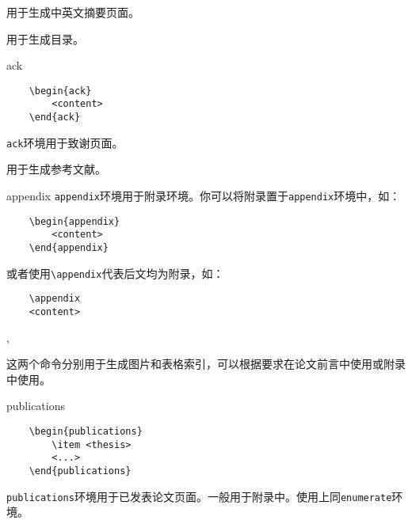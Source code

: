 \documentclass[12pt,a4paper,numbered,full]{l3doc}
\begin{document}
\begin{function}{\makeabstract}
    用于生成中英文摘要页面。
\end{function}

\begin{function}{\tableofcontents}
    用于生成目录。
\end{function}

\begin{environment}{ack}
    \begin{verbatim}
    \begin{ack}
        <content>
    \end{ack}
    \end{verbatim}
    \verb+ack+环境用于致谢页面。
\end{environment}

\begin{function}{}
    \begin{syntax}
    \end{syntax}
    用于生成参考文献。
\end{function}

\begin{environment}{appendix}
    \verb+appendix+环境用于附录环境。你可以将附录置于\verb+appendix+环境中，如：
    \begin{verbatim}
    \begin{appendix}
        <content>
    \end{appendix}
    \end{verbatim}
\begin{function}{\appendix}
    或者使用\verb+\appendix+代表后文均为附录，如：
    \begin{verbatim}
    \appendix
    <content>
    \end{verbatim}
\end{function}
\end{environment}

\begin{function}{\listoffigures,\listoftables}
    这两个命令分别用于生成图片和表格索引，可以根据要求在论文前言中使用或附录中使用。
\end{function}

\begin{environment}{publications}
    \begin{verbatim}
    \begin{publications}
        \item <thesis>
        <...>
    \end{publications}
    \end{verbatim}
    \verb+publications+环境用于已发表论文页面。一般用于附录中。使用上同\verb+enumerate+环境。
\end{environment}
\end{document}
